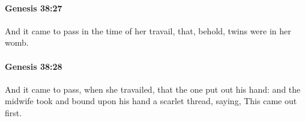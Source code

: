 		\paragraph{Genesis 38:27} %
			\label{GENESIS-38-27}

			And it came to pass in the time of her travail, that, behold, twins were in her womb.


		\paragraph{Genesis 38:28} %
			\label{GENESIS-38-28}

			And it came to pass, when she travailed, that the one put out his hand: and the midwife took and bound upon his hand a scarlet thread, saying, This came out first.


